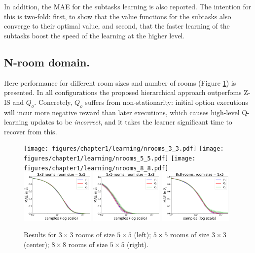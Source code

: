 In addition, the MAE for the subtasks learning is also reported. The intention for this is two-fold: first, to show that the value functions for the subtasks also converge to their optimal value, and second, that the faster learning of the subtasks boost the speed of the learning at the higher level.

\subsection{N-room domain.}
Here performance for different room sizes and number of rooms (Figure \ref{fig:hlmdps_errors_nrooms}) is presented. In all configurations the proposed hierarchical approach outperfoms Z-IS and $Q_o$. Concretely, $Q_o$ suffers from non-stationarity: initial option executions will incur more negative reward than later executions, which causes high-level Q-learning updates to be {\em incorrect}, and it takes the learner significant time to recover from this.

\begin{figure}[!htb]
\centering
\texttt{[image: figures/chapter1/learning/nrooms\_3\_3.pdf]}
\texttt{[image: figures/chapter1/learning/nrooms\_5\_5.pdf]}
\texttt{[image: figures/chapter1/learning/nrooms\_8\_8.pdf]}
\includegraphics[width=0.32\textwidth]{figures/chapter1/subtasks/nrooms_3_3_subtasks.pdf}
\includegraphics[width=0.32\textwidth]{figures/chapter1/subtasks/nrooms_5_5_subtasks.pdf}
\includegraphics[width=0.32\textwidth]{figures/chapter1/subtasks/nrooms_8_8_subtasks.pdf}
\caption{ Results for $3\times 3$ rooms of size $5 \times 5$ (left);
$5\times 5$ rooms of size $3 \times 3$ (center); $8 \times 8$ rooms of size $5\times 5$ (right).}
\label{fig:hlmdps_errors_nrooms}
\end{figure}

